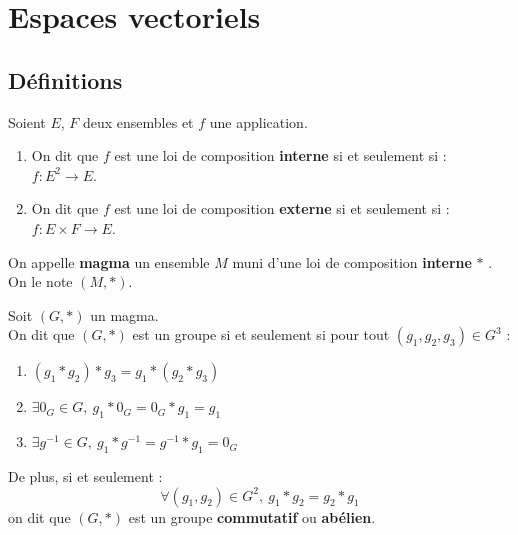 \chapter{Espaces vectoriels}\label{chap:espaces_vectoriels}

\section{Définitions}
\begin{definition}
	Soient $E$, $F$ deux ensembles et $f$ une application.
	\begin{enumerate}
		\item On dit que $f$ est une loi de composition \textbf{interne} si et seulement si : $f : E^2 \to E$.
		\item On dit que $f$ est une loi de composition \textbf{externe} si et seulement si : $f : E \times F \to E$.
	\end{enumerate}
\end{definition}

\begin{definition}[Magma]
	On appelle \textbf{magma} un ensemble $M$ muni d'une loi de composition \textbf{interne} \og $*$ \fg. 
	\\
	On le note $(M, *)$.
\end{definition}

\begin{definition}[Groupe]
	Soit $(G, *)$ un magma.
	\\ 
	On dit que $(G, *)$ est un groupe si et seulement si pour tout $(g_1, g_2, g_3) \in G^3$ : 
    \begin{enumerate}
    		\item $(g_1 * g_2) * g_3 = g_1 * (g_2 * g_3)$
    		\item $\exists 0_G \in G,\ g_1 * 0_G = 0_G * g_1 = g_1$
    		\item $\exists g^{-1} \in G,\ g_1 * g^{-1} = g^{-1} * g_1 = 0_G$
    	\end{enumerate}
    \noindent De plus, si et seulement :
    \[ \forall (g_1, g_2) \in G^2,\ g_1 * g_2 = g_2* g_1 \]
    on dit que $(G, *)$ est un groupe \textbf{commutatif} ou \textbf{abélien}.
\end{definition}

